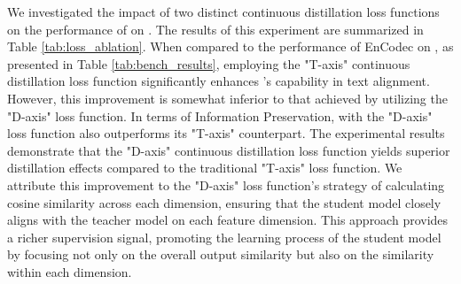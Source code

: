 We investigated the impact of two distinct continuous distillation loss functions on the performance of \method on \bench. The results of this experiment are summarized in Table \ref{tab:loss_ablation}. When compared to the performance of EnCodec on \bench, as presented in Table \ref{tab:bench_results}, employing the "T-axis" continuous distillation loss function significantly enhances \method's capability in text alignment. However, this improvement is somewhat inferior to that achieved by \method utilizing the "D-axis" loss function. In terms of Information Preservation, \method with the "D-axis" loss function also outperforms its "T-axis" counterpart. The experimental results demonstrate that the "D-axis" continuous distillation loss function yields superior distillation effects compared to the traditional "T-axis" loss function. We attribute this improvement to the "D-axis" loss function's strategy of calculating cosine similarity across each dimension, ensuring that the student model closely aligns with the teacher model on each feature dimension. This approach provides a richer supervision signal, promoting the learning process of the student model by focusing not only on the overall output similarity but also on the similarity within each dimension.


